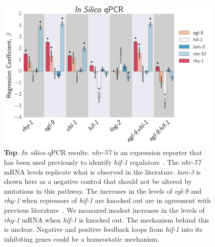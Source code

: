 \documentclass[9pt,twocolumn,twoside]{pnas-new}
\newcommand{\egl}{\emph{egl-9}}
\newcommand{\rhy}{\emph{rhy-1}}
\newcommand{\hif}{\emph{hif-1}}
\newcommand{\nhr}{\emph{nhr-57}}
\newcommand{\lam}{\emph{lam-3}}
\begin{document}
\begin{figure}[tbhp]
\centering
\includegraphics[width=\linewidth]{figs/qpcr.pdf}
\caption{\textbf{Top}: \emph{In silico} qPCR results. \nhr{} is an expression reporter that has been used previously to identify \hif{} regulators~\cite{Shen2006,Shao2009}. The \nhr{} mRNA levels replicate what is observed in the literature. \lam{} is shown here as a negative control that should not be altered by mutations in this pathway. The increases in the levels of \egl{} and \rhy{} when repressors of \hif{} are knocked out are in agreement with previous literature~\cite{Powell-Coffman2010}. We measured modest increases in the levels of \rhy{} mRNA when \hif{} is knocked out. The mechanism behind this is unclear. Negative and positive feedback loops from \hif{} into its inhibiting genes could be a homeostatic mechanism.}
\label{fig:qpcr}
\end{figure}
\end{document}
